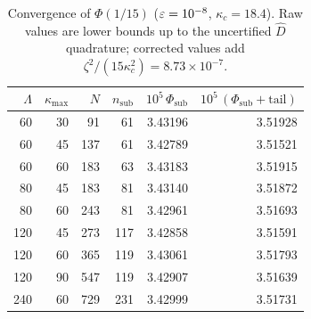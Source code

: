 \begin{table}[ht]\centering\small
\caption{Convergence of \(\Phi(1/15)\) (\(\varepsilon=10^{-8}\), \(\kappa_c=18.4\)). Raw values are lower bounds up to the uncertified \(\widehat D\) quadrature; corrected values add \(\zeta^2/(15\kappa_c^2)=8.73\times10^{-7}\).}\label{tab:convergence}
\begin{tabular}{rrrr r r}\toprule
\(\Lambda\) & \(\kappa_{\max}\) & \(N\) & \(n_{\mathrm{sub}}\) & \(10^5\,\Phi_{\mathrm{sub}}\) & \(10^5\,(\Phi_{\mathrm{sub}}+\text{tail})\) \\\midrule
60 & 30 & 91 & 61 & 3.43196 & 3.51928 \\
60 & 45 & 137 & 61 & 3.42789 & 3.51521 \\
60 & 60 & 183 & 63 & 3.43183 & 3.51915 \\
80 & 45 & 183 & 81 & 3.43140 & 3.51872 \\
80 & 60 & 243 & 81 & 3.42961 & 3.51693 \\
120 & 45 & 273 & 117 & 3.42858 & 3.51591 \\
120 & 60 & 365 & 119 & 3.43061 & 3.51793 \\
120 & 90 & 547 & 119 & 3.42907 & 3.51639 \\
240 & 60 & 729 & 231 & 3.42999 & 3.51731 \\
\bottomrule\end{tabular}\end{table}
